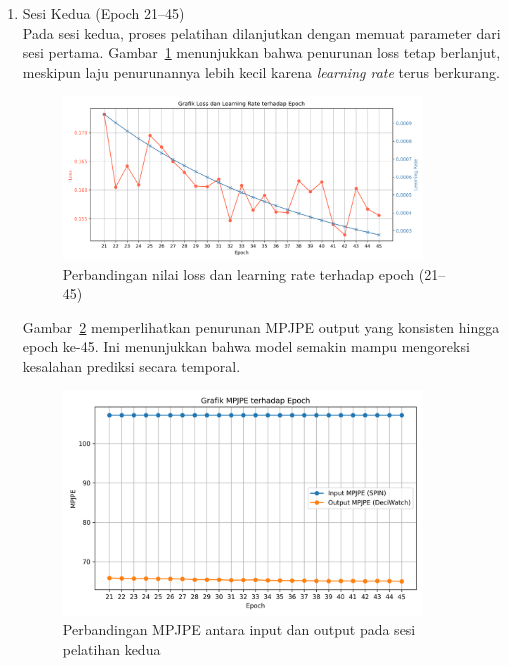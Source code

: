 \begin{enumerate}
    \item {Sesi Kedua (Epoch 21--45)} \\
    Pada sesi kedua, proses pelatihan dilanjutkan dengan memuat parameter dari sesi pertama. Gambar~\ref{fig:loss_lr_epoch_2} menunjukkan bahwa penurunan loss tetap berlanjut, meskipun laju penurunannya lebih kecil karena \textit{learning rate} terus berkurang.

    \begin{figure}[H]
        \centering
        \includegraphics[width=0.9\textwidth]{images/loss_lr_vs_epoch_2.png}
        \caption{Perbandingan nilai loss dan learning rate terhadap epoch (21--45)}
        \label{fig:loss_lr_epoch_2}
    \end{figure}

    Gambar~\ref{fig:mpjpe_epoch_2} memperlihatkan penurunan MPJPE output yang konsisten hingga epoch ke-45. Ini menunjukkan bahwa model semakin mampu mengoreksi kesalahan prediksi secara temporal.

    \begin{figure}[H]
        \centering
        \includegraphics[width=0.9\textwidth]{images/mpjpe_vs_epoch_2.png}
        \caption{Perbandingan MPJPE antara input dan output pada sesi pelatihan kedua}
        \label{fig:mpjpe_epoch_2}
    \end{figure}
\end{enumerate}

